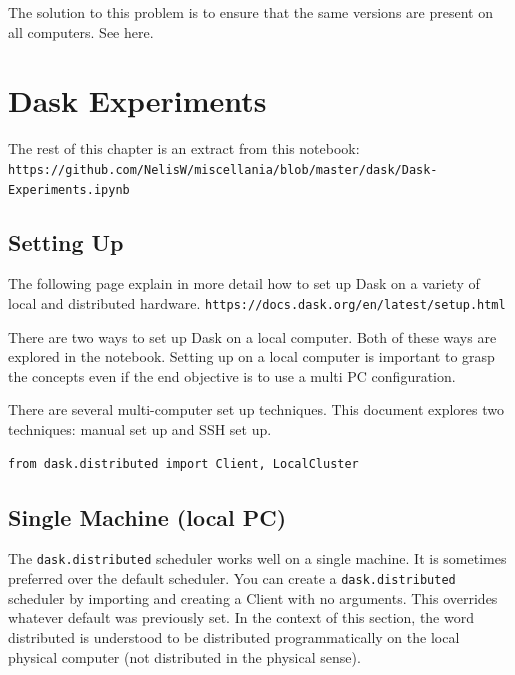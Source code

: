 The solution to this problem is to ensure that the same versions are present on all computers.
See  here.




\section{Dask Experiments}
\label{sec:DaskExperiments}

The rest of this chapter is an extract from this notebook:\\
\lstinline{https://github.com/NelisW/miscellania/blob/master/dask/Dask-Experiments.ipynb}


\subsection{Setting Up}
\label{sec:SettingUp}

The following page explain in more detail how to set up Dask on a variety of local and distributed hardware.
\lstinline{https://docs.dask.org/en/latest/setup.html}


There are two ways to set up Dask on a local computer. Both of these ways are explored in the notebook.
Setting up on a local computer is important to grasp the concepts even if the end objective is to use a multi PC configuration.


There are several multi-computer set up techniques. This document explores two techniques: manual set up and SSH set up.



\begin{lstlisting}[style=incellstyle]
from dask.distributed import Client, LocalCluster

\end{lstlisting}


\subsection{Single Machine (local PC)}
\label{sec:SingleMachinelocalPC}

The \verb+dask.distributed+ scheduler works well on a single machine. It is sometimes preferred over the default scheduler. 
You can create a \verb+dask.distributed+ scheduler by importing and creating a Client with no arguments. This overrides whatever default was previously set.  In the context of this section, the word distributed is understood to be distributed programmatically on the local physical computer (not distributed in the physical sense).


